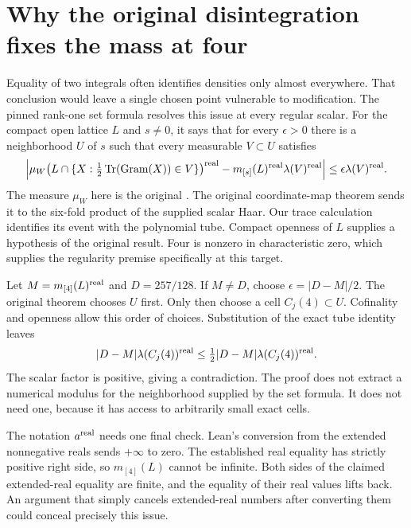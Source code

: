 \documentclass[12pt,letterpaper]{article}
\newcommand{\code}[1]{\texttt{\detokenize{#1}}}
\begin{document}
\section{Why the original disintegration fixes the mass at four}
Equality of two integrals often identifies densities only almost everywhere. That conclusion would leave a single chosen point vulnerable to modification. The pinned rank-one set formula resolves this issue at every regular scalar. For the compact open lattice $L$ and $s\ne0$, it says that for every $\epsilon>0$ there is a neighborhood $U$ of $s$ such that every measurable $V\subset U$ satisfies
\[
 \left|\mu_W\!\left(L\cap\{X:\tfrac12\operatorname{Tr}(\mathrm{Gram}(X))\in V\}\right)^{\rm real}
       -m_{[s]}(L)^{\rm real}\lambda(V)^{\rm real}\right|
       \le\epsilon\lambda(V)^{\rm real}.
\]
The measure $\mu_W$ here is the original \code{coordW}. The original coordinate-map theorem sends it to the six-fold product of the supplied scalar Haar. Our trace calculation identifies its event with the polynomial tube. Compact openness of $L$ supplies a hypothesis of the original result. Four is nonzero in characteristic zero, which supplies the regularity premise specifically at this target.
\par
Let $M=m_{[4]}(L)^{\rm real}$ and $D=257/128$. If $M\ne D$, choose $\epsilon=|D-M|/2$. The original theorem chooses $U$ first. Only then choose a cell $C_j(4)\subset U$. Cofinality and openness allow this order of choices. Substitution of the exact tube identity leaves
\[
        |D-M|\lambda(C_j(4))^{\rm real}
           \le \tfrac12|D-M|\lambda(C_j(4))^{\rm real}.
\]
The scalar factor is positive, giving a contradiction. The proof does not extract a numerical modulus for the neighborhood supplied by the set formula. It does not need one, because it has access to arbitrarily small exact cells.
\par
The notation $a^{\rm real}$ needs one final check. Lean's conversion from the extended nonnegative reals sends $+\infty$ to zero. The established real equality has strictly positive right side, so $m_{[4]}(L)$ cannot be infinite. Both sides of the claimed extended-real equality are finite, and the equality of their real values lifts back. An argument that simply cancels extended-real numbers after converting them could conceal precisely this issue.
\end{document}
